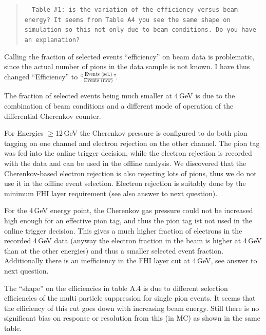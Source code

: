 \documentclass[twoside,a4paper,12pt]{article}
\begin{document}
\begin{quote}\texttt{- Table \#1: is the variation of the efficiency versus beam energy?
It seems from Table A4 you see the same shape on simulation so this not only due to beam conditions. Do you have an explanation?}\end{quote}
Calling the fraction of selected events ``efficiency'' on beam data is problematic, since the actual number of pions in the data sample is not known. I have thus changed ``Efficiency'' to ``$\frac{\text{Events (sel.)}}{\text{Events (raw)}}$''.

The fraction of selected events being much smaller at 4\,GeV is due to the combination of beam conditions and a different mode of operation of the differential Cherenkov counter. 

For Energies $\geq$12\,GeV the Cherenkov pressure is configured to do both pion tagging on one channel and electron rejection on the other channel. The pion tag was fed into the online trigger decision, while the electron rejection is recorded with the data and can be used in the offline analysis. We discovered that the Cherenkov-based electron rejection is also rejecting lots of pions, thus we do not use it in the offline event selection. Electron rejection is suitably done by the minimum FHI layer requirement (see also answer to next question).

For the 4\,GeV energy point, the Cherenkov gas pressure could not be increased high enough for an effective pion tag, and thus the pion tag ist not used in the online trigger decision. This gives a much higher fraction of electrons in the recorded 4\,GeV data (anyway the electron fraction in the beam is higher at 4\,GeV than at the other energies) and thus a smaller selected event fraction. Additionally there is an inefficiency in the FHI layer cut at 4\,GeV, see answer to next question. 

The ``shape'' on the efficiencies in table A.4 is due to different selection efficiencies of the multi particle suppression for single pion events. It seems that the efficiency of this cut goes down with increasing beam energy. Still there is no significant bias on response or resolution from this (in MC) as shown in the same table.
\end{document}
